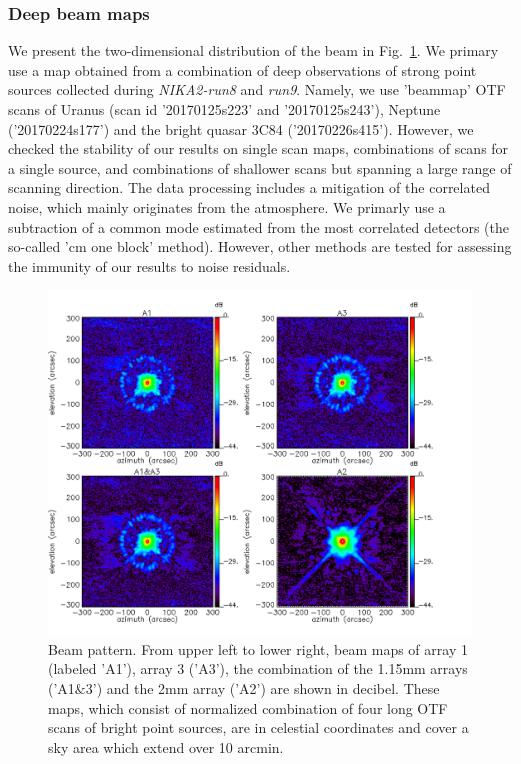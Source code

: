 \subsubsection{Deep beam maps}
We present the two-dimensional distribution of the beam in Fig.~\ref{fig:beam}. We primary use a map obtained from a combination of deep observations of strong point sources collected during \emph{NIKA2-run8} and \emph{run9}. Namely, we use 'beammap' OTF scans of Uranus (scan id '20170125s223' and '20170125s243'),  Neptune ('20170224s177') and the bright quasar 3C84 ('20170226s415'). However, we checked the stability of our results on single scan maps, combinations of scans for a single source, and combinations of shallower scans but spanning a large range of scanning direction. The data processing includes a mitigation of the correlated noise, which mainly originates from the atmosphere.  We primarly use a subtraction of a common mode estimated from the most correlated detectors (the so-called 'cm one block' method). However, other methods are tested for assessing the immunity of our results to noise residuals.

\begin{figure}
\begin{center}
  \includegraphics[clip, angle=0, scale=0.4]{Figures/Lobe_map_Combo_v2_dB.pdf}
 \caption{Beam pattern. From upper left to lower right, beam maps of array 1 (labeled 'A1'), array 3 ('A3'), the combination of the 1.15mm arrays ('A1$\&$3') and the 2mm array ('A2') are shown in decibel. These maps, which consist of normalized combination of four long OTF scans of bright point sources, are in celestial coordinates and cover a sky area which extend over 10 arcmin.}
\label{fig:beam}
\end{center}
\end{figure}


